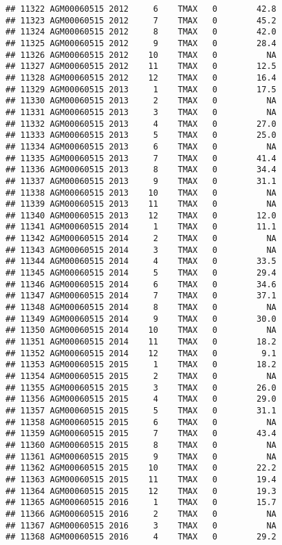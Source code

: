 \documentclass{article}\usepackage[]{graphicx}\usepackage[]{color}
\makeatletter
\newenvironment{kframe}{%
 \def\at@end@of@kframe{}%
 \ifinner\ifhmode%
  \def\at@end@of@kframe{\end{minipage}}%
  \begin{minipage}{\columnwidth}%
 \fi\fi%
 \def\FrameCommand##1{\hskip\@totalleftmargin \hskip-\fboxsep
 \colorbox{shadecolor}{##1}\hskip-\fboxsep
     \hskip-\linewidth \hskip-\@totalleftmargin \hskip\columnwidth}%
 \MakeFramed {\advance\hsize-\width
   \@totalleftmargin\z@ \linewidth\hsize
   \@setminipage}}%
 {\par\unskip\endMakeFramed%
 \at@end@of@kframe}
\newenvironment{knitrout}{}{} %
\makeatother
\begin{document}
\begin{knitrout}
\begin{kframe}
\begin{verbatim}
## 11322 AGM00060515 2012     6    TMAX   0        42.8
## 11323 AGM00060515 2012     7    TMAX   0        45.2
## 11324 AGM00060515 2012     8    TMAX   0        42.0
## 11325 AGM00060515 2012     9    TMAX   0        28.4
## 11326 AGM00060515 2012    10    TMAX   0          NA
## 11327 AGM00060515 2012    11    TMAX   0        12.5
## 11328 AGM00060515 2012    12    TMAX   0        16.4
## 11329 AGM00060515 2013     1    TMAX   0        17.5
## 11330 AGM00060515 2013     2    TMAX   0          NA
## 11331 AGM00060515 2013     3    TMAX   0          NA
## 11332 AGM00060515 2013     4    TMAX   0        27.0
## 11333 AGM00060515 2013     5    TMAX   0        25.0
## 11334 AGM00060515 2013     6    TMAX   0          NA
## 11335 AGM00060515 2013     7    TMAX   0        41.4
## 11336 AGM00060515 2013     8    TMAX   0        34.4
## 11337 AGM00060515 2013     9    TMAX   0        31.1
## 11338 AGM00060515 2013    10    TMAX   0          NA
## 11339 AGM00060515 2013    11    TMAX   0          NA
## 11340 AGM00060515 2013    12    TMAX   0        12.0
## 11341 AGM00060515 2014     1    TMAX   0        11.1
## 11342 AGM00060515 2014     2    TMAX   0          NA
## 11343 AGM00060515 2014     3    TMAX   0          NA
## 11344 AGM00060515 2014     4    TMAX   0        33.5
## 11345 AGM00060515 2014     5    TMAX   0        29.4
## 11346 AGM00060515 2014     6    TMAX   0        34.6
## 11347 AGM00060515 2014     7    TMAX   0        37.1
## 11348 AGM00060515 2014     8    TMAX   0          NA
## 11349 AGM00060515 2014     9    TMAX   0        30.0
## 11350 AGM00060515 2014    10    TMAX   0          NA
## 11351 AGM00060515 2014    11    TMAX   0        18.2
## 11352 AGM00060515 2014    12    TMAX   0         9.1
## 11353 AGM00060515 2015     1    TMAX   0        18.2
## 11354 AGM00060515 2015     2    TMAX   0          NA
## 11355 AGM00060515 2015     3    TMAX   0        26.0
## 11356 AGM00060515 2015     4    TMAX   0        29.0
## 11357 AGM00060515 2015     5    TMAX   0        31.1
## 11358 AGM00060515 2015     6    TMAX   0          NA
## 11359 AGM00060515 2015     7    TMAX   0        43.4
## 11360 AGM00060515 2015     8    TMAX   0          NA
## 11361 AGM00060515 2015     9    TMAX   0          NA
## 11362 AGM00060515 2015    10    TMAX   0        22.2
## 11363 AGM00060515 2015    11    TMAX   0        19.4
## 11364 AGM00060515 2015    12    TMAX   0        19.3
## 11365 AGM00060515 2016     1    TMAX   0        15.7
## 11366 AGM00060515 2016     2    TMAX   0          NA
## 11367 AGM00060515 2016     3    TMAX   0          NA
## 11368 AGM00060515 2016     4    TMAX   0        29.2

\end{verbatim}
\end{kframe}
\end{knitrout}
\end{document}
